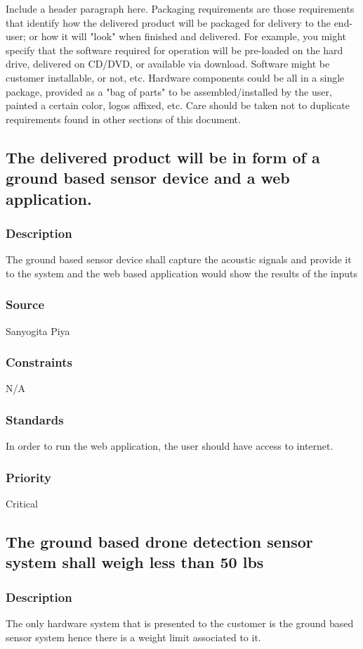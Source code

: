 Include a header paragraph here. Packaging requirements are those requirements that identify how the delivered product will be packaged for delivery to the end-user; or how it will "look" when finished and delivered. For example, you might specify that the software required for operation will be pre-loaded on the hard drive, delivered on CD/DVD, or available via download. Software might be customer installable, or not, etc. Hardware components could be all in a single package, provided as a "bag of parts" to be assembled/installed by the user, painted a certain color, logos affixed, etc. Care should be taken not to duplicate requirements found in other sections of this document.

\subsection{The delivered product will be in form of a ground based sensor device and a web application.}
\subsubsection{Description}
The ground based sensor device shall capture the acoustic signals and provide it to the system and the web based application would show the results of the inputs
\subsubsection{Source}
Sanyogita Piya
\subsubsection{Constraints}
N/A
\subsubsection{Standards}
In order to run the web application, the user should have access to internet.
\subsubsection{Priority}
Critical

\subsection{The ground based drone detection sensor system shall weigh less than 50 lbs}
\subsubsection{Description}
The only hardware system that is presented to the customer is the ground based sensor system hence there is a weight limit associated to it.
